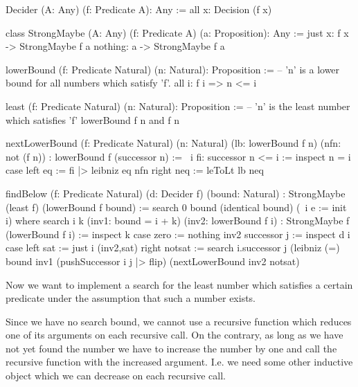 \begin{alba}
    Decider (A: Any) (f: Predicate A): Any :=
        all x: Decision (f x)

    class StrongMaybe (A: Any) (f: Predicate A) (a: Proposition): Any :=
        just x: f x -> StrongMaybe f a
        nothing: a -> StrongMaybe f a

    lowerBound (f: Predicate Natural) (n: Natural): Proposition :=
            -- 'n' is a lower bound for all numbers which satisfy 'f'.
        all i: f i => n <= i

    least (f: Predicate Natural) (n: Natural): Proposition :=
            -- 'n' is the least number which satisfies 'f'
        lowerBound f n and f n

    nextLowerBound
        (f: Predicate Natural) (n: Natural)
        (lb: lowerBound f n) (nfn: not (f n))
        : lowerBound f (successor n)
    :=
        \ i fi: successor n <= i :=
            inspect n = i case
                left eq :=
                    fi |> leibniz eq nfn
                right neq :=
                    leToLt lb neq

    findBelow
        (f: Predicate Natural)
        (d: Decider f)
        (bound: Natural)
        : StrongMaybe (least f) (lowerBound f bound)
    :=
        search 0 bound (identical bound) (\ i e := init i)
        where
            search
                i k
                (inv1: bound = i + k)
                (inv2: lowerBound f i)
                : StrongMaybe f (lowerBound f i)
            :=
                inspect k case
                    zero :=
                        nothing inv2
                    successor j :=
                        inspect d i case
                            left sat :=
                                just i (inv2,sat)
                            right notsat :=
                                search
                                    i.successor
                                    j
                                    (leibniz
                                        {(=) bound}
                                        inv1
                                        (pushSuccessor {i} {j} |> flip)
                                    (nextLowerBound inv2 notsat)
\end{alba}


Now we want to implement a search for the least number which satisfies a
certain predicate under the assumption that such a number exists.

Since we have no search bound, we cannot use a recursive function which reduces
one of its arguments on each recursive call. On the contrary, as long as we have
not yet found the number we have to increase the number by one and call the
recursive function with the increased argument. I.e. we need some other
inductive object which we can decrease on each recursive call.

